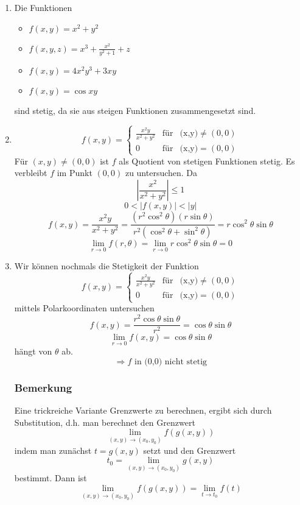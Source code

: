 \begin{enumerate}
\item Die Funktionen
\begin{itemize}
\item $f(x,y)=x^2+y^2$
\item $f(x,y,z)=x^3+\frac{x^2}{y^2+1}+z$
\item $f(x,y)=4x^2 y^3+3xy$
\item $f(x,y)=\cos xy$
\end{itemize}
sind stetig, da sie aus steigen Funktionen zusammengesetzt sind.

\item \[f(x,y) = \left\{ {\begin{array}{*{20}{c}}
{\frac{{{x^2}y}}{{{x^2} + {y^2}}}}&{{\text{für}}}&{{\text{(x,y)}}\not  = (0,0)}\\
0&{{\text{für}}}&{{\text{(x,y)}}= (0,0)}
\end{array}} \right.\]
Für $(x,y)\not=(0,0)$ ist $f$ als Quotient von stetigen Funktionen stetig. Es verbleibt $f$ im Punkt $(0,0)$ zu untersuchen. Da \[\left| {\frac{{{x^2}}}{{{x^2} + {y^2}}}} \right| \le 1\] \[ 0<\left| f(x,y)\right| <\left| y\right|\] \[f(x,y) = \frac{{{x^2}y}}{{{x^2} + {y^2}}} = \frac{{\left( {{r^2}{{\cos }^2}\theta } \right)\left( {r\sin \theta } \right)}}{{{r^2}\left( {{{\cos }^2}\theta  + {{\sin }^2}\theta } \right)}} = r{\cos ^2}\theta \sin \theta \]
\[\mathop {\lim }\limits_{r \to 0} f(r,\theta ) = \mathop {\lim }\limits_{r \to 0} r{\cos ^2}\theta \sin \theta  = 0\]
\item Wir können nochmals die Stetigkeit der Funktion
\[f(x,y) = \left\{ {\begin{array}{*{20}{c}}
{\frac{{{x^2}y}}{{{x^2} + {y^2}}}}&{{\text{für}}}&{{\text{(x,y)}}\not  = (0,0)}\\
0&{{\text{für}}}&{{\text{(x,y)}}= (0,0)}
\end{array}} \right.\] mittels Polarkoordinaten untersuchen \[f(x,y)=\frac{r^2\cos\theta\sin\theta}{r^2}=\cos\theta\sin\theta\] \[\mathop {\lim }\limits_{r \to 0} f(x,y) = \cos \theta \sin \theta \] hängt von $\theta$ ab. \[\Rightarrow f\text{ in (0,0) nicht stetig}\]

\subsubsection*{Bemerkung}
Eine trickreiche Variante Grenzwerte zu berechnen, ergibt sich durch Substitution, d.h. man berechnet den Grenzwert \[\mathop {\lim }\limits_{(x,y) \to ({x_0},{y_0})} f\left( {g(x,y)} \right)\] indem man zunächst $t=g(x,y)$ setzt und den Grenzwert \[{t_0} = \mathop {\lim }\limits_{(x,y) \to ({x_0},{y_0})} g(x,y)\] bestimmt. Dann ist \[\mathop {\lim }\limits_{(x,y) \to ({x_0},{y_0})} f\left( {g(x,y)} \right) = \mathop {\lim }\limits_{t \to {t_0}} f(t)\]
\end{enumerate}

